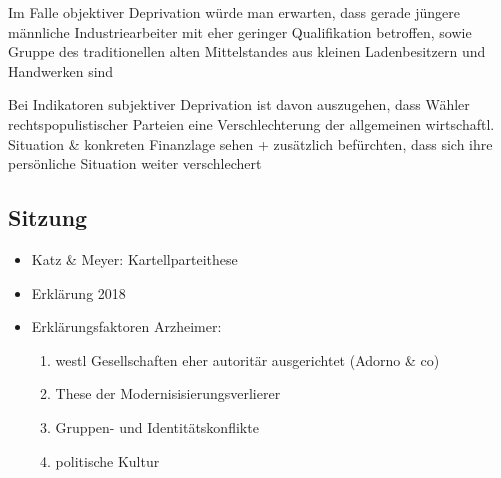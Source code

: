 \documentclass[11pt]{article}
\begin{document}
Im Falle objektiver Deprivation würde man erwarten, dass gerade jüngere männliche Industriearbeiter mit eher geringer Qualifikation betroffen, sowie Gruppe des traditionellen alten Mittelstandes aus kleinen Ladenbesitzern und Handwerken sind

Bei Indikatoren subjektiver Deprivation ist davon auszugehen, dass Wähler rechtspopulistischer Parteien eine Verschlechterung der allgemeinen wirtschaftl. Situation \& konkreten Finanzlage sehen + zusätzlich befürchten, dass sich ihre persönliche Situation weiter verschlechert

\subsection{Sitzung}
\label{sec:org4d6ce5c}
\begin{itemize}
\item Katz \& Meyer: Kartellparteithese
\item Erklärung 2018
\item Erklärungsfaktoren Arzheimer:
\begin{enumerate}
\item westl Gesellschaften eher autoritär ausgerichtet (Adorno \& co)
\item These der Modernisisierungsverlierer
\item Gruppen- und Identitätskonflikte
\item politische Kultur
\end{enumerate}
\end{itemize}
\end{document}
